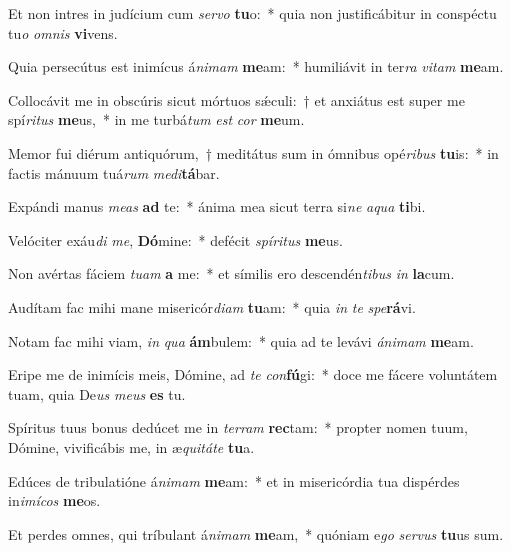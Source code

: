 \item Et non intres in judícium cum \textit{ser}\textit{vo} \textbf{tu}o:~* quia non justificábitur in conspéctu tu\textit{o} \textit{om}\textit{nis} \textbf{vi}vens.
\item Quia persecútus est inimícus á\textit{ni}\textit{mam} \textbf{me}am:~* humiliávit in ter\textit{ra} \textit{vi}\textit{tam} \textbf{me}am.
\item Collocávit me in obscúris sicut mórtuos sǽculi:~† et anxiátus est super me spí\textit{ri}\textit{tus} \textbf{me}us,~* in me turbá\textit{tum} \textit{est} \textit{cor} \textbf{me}um.
\item Memor fui diérum antiquórum,~† meditátus sum in ómnibus opé\textit{ri}\textit{bus} \textbf{tu}is:~* in factis mánuum tuá\textit{rum} \textit{me}\textit{di}\textbf{tá}bar.
\item Expándi manus \textit{me}\textit{as} \textbf{ad} te:~* ánima mea sicut terra si\textit{ne} \textit{a}\textit{qua} \textbf{ti}bi.
\item Velóciter exáu\textit{di} \textit{me}, \textbf{Dó}mine:~* defécit \textit{spí}\textit{ri}\textit{tus} \textbf{me}us.
\item Non avértas fáciem \textit{tu}\textit{am} \textbf{a} me:~* et símilis ero descendén\textit{ti}\textit{bus} \textit{in} \textbf{la}cum.
\item Audítam fac mihi mane misericór\textit{di}\textit{am} \textbf{tu}am:~* quia \textit{in} \textit{te} \textit{spe}\textbf{rá}vi.
\item Notam fac mihi viam, \textit{in} \textit{qua} \textbf{ám}bulem:~* quia ad te levávi \textit{á}\textit{ni}\textit{mam} \textbf{me}am.
\item Eripe me de inimícis meis, Dómine, ad \textit{te} \textit{con}\textbf{fú}gi:~* doce me fácere voluntátem tuam, quia De\textit{us} \textit{me}\textit{us} \textbf{es} tu.
\item Spíritus tuus bonus dedúcet me in \textit{ter}\textit{ram} \textbf{rec}tam:~* propter nomen tuum, Dómine, vivificábis me, in æ\textit{qui}\textit{tá}\textit{te} \textbf{tu}a.
\item Edúces de tribulatióne á\textit{ni}\textit{mam} \textbf{me}am:~* et in misericórdia tua dispérdes in\textit{i}\textit{mí}\textit{cos} \textbf{me}os.
\item Et perdes omnes, qui tríbulant á\textit{ni}\textit{mam} \textbf{me}am,~* quóniam e\textit{go} \textit{ser}\textit{vus} \textbf{tu}us sum.
